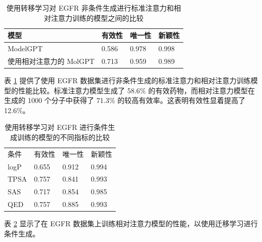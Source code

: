 \begin{table}[H]
  \centering
  \caption{使用转移学习对 EGFR 非条件生成进行标准注意力和相对注意力训练的模型之间的比较}
  \label{tab:13}
  \begin{tabular}{llll}
    \hline 模型 & 有效性 & 唯一性 & 新颖性 \\
    \hline ModelGPT & 0.586 & 0.978 & 0.998 \\
    使用相对注意力的 MolGPT & 0.713 & 0.959 & 0.989 \\
    \hline
    \end{tabular}
\end{table}

表 \ref{tab:13} 提供了使用 EGFR 数据集进行非条件生成的标准注意力和相对注意力训练模型的性能比较。标准注意力模型生成了 58.6\% 的有效药物，而相对注意力模型在生成的 1000 个分子中获得了 71.3\% 的较高有效率。这表明有效性显着提高了 12.6\%。

\begin{table}[H]
  \centering
  \caption{使用转移学习对 EGFR 进行条件生成训练的模型的不同指标的比较}
  \label{tab:14}
  \begin{tabular}{llll}
    \hline 条件 & 有效性 & 唯一性 & 新颖性 \\
    logP & 0.655 & 0.912 & 0.994 \\
    TPSA & 0.757 & 0.841 & 0.993 \\
    SAS & 0.717 & 0.854 & 0.985 \\
    QED & 0.757 & 0.885 & 0.993 \\
    \hline
    \end{tabular}
\end{table}

表 \ref{tab:14} 显示了在 EGFR 数据集上训练相对注意力模型的性能，以使用迁移学习进行条件生成。


